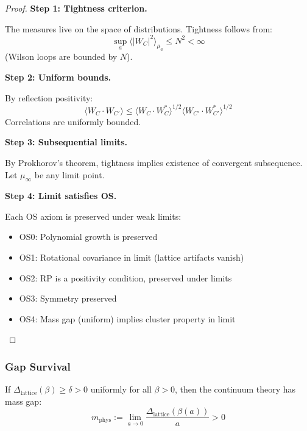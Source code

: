 \begin{proof}
\textbf{Step 1: Tightness criterion.}

The measures live on the space of distributions. Tightness follows from:
\[
\sup_a \langle |W_C|^2 \rangle_{\mu_a} \leq N^2 < \infty
\]
(Wilson loops are bounded by $N$).

\textbf{Step 2: Uniform bounds.}

By reflection positivity:
\[
\langle W_C \cdot W_{C'} \rangle \leq \langle W_C \cdot W_C^* \rangle^{1/2} 
\langle W_{C'} \cdot W_{C'}^* \rangle^{1/2}
\]
Correlations are uniformly bounded.

\textbf{Step 3: Subsequential limits.}

By Prokhorov's theorem, tightness implies existence of convergent subsequence.
Let $\mu_\infty$ be any limit point.

\textbf{Step 4: Limit satisfies OS.}

Each OS axiom is preserved under weak limits:
\begin{itemize}
\item OS0: Polynomial growth is preserved
\item OS1: Rotational covariance in limit (lattice artifacts vanish)
\item OS2: RP is a positivity condition, preserved under limits
\item OS3: Symmetry preserved
\item OS4: Mass gap (uniform) implies cluster property in limit
\end{itemize}
\end{proof}

\subsubsection{Gap Survival}

\begin{theorem}
\label{thm:gap-survival-complete}
If $\Delta_{\text{lattice}}(\beta) \geq \delta > 0$ uniformly for all $\beta > 0$, then 
the continuum theory has mass gap:
\[
m_{\text{phys}} := \lim_{a \to 0} \frac{\Delta_{\text{lattice}}(\beta(a))}{a} > 0
\]
\end{theorem}

